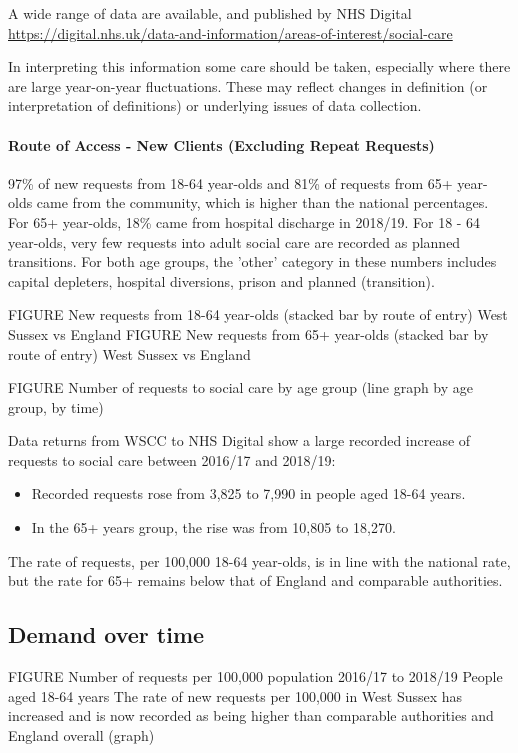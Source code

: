 A wide range of data are available, and published by NHS Digital \url{https://digital.nhs.uk/data-and-information/areas-of-interest/social-care}

In interpreting this information some care should be taken, especially where there are large year-on-year fluctuations. These may reflect changes in definition (or interpretation of definitions) or underlying issues of data collection.

\paragraph{Route of Access - New Clients (Excluding Repeat Requests)} 97\% of new requests from 18-64 year-olds and 81\% of requests from 65+ year- olds came from the community, which is higher than the national percentages. For 65+ year-olds, 18\% came from hospital discharge in 2018/19. For 18 - 64 year-olds, very few requests into adult social care are recorded as planned transitions. For both age groups, the 'other' category in these numbers includes capital depleters, hospital diversions, prison and planned (transition). 

FIGURE New requests from 18-64 year-olds (stacked bar by route of entry) West Sussex vs England
FIGURE New requests from 65+ year-olds (stacked bar by route of entry) West Sussex vs England

FIGURE Number of requests to social care by age group (line graph by age group, by time)

Data returns from WSCC to NHS Digital show a large recorded increase of requests to social care between 2016/17 and 2018/19:

\begin{itemize}[noitemsep]
    \item Recorded requests rose from 3,825 to 7,990 in people aged 18-64 years.
    \item In the 65+ years group, the rise was from 10,805 to 18,270.
\end{itemize}

The rate of requests, per 100,000 18-64 year-olds, is in line with the national rate, but the rate for 65+ remains below that of England and comparable authorities.

\subsection{Demand over time}
FIGURE Number of requests per 100,000 population 2016/17 to 2018/19 People aged 18-64 years The rate of new requests per 100,000 in West Sussex has increased and is now recorded as being higher than comparable authorities and England overall (graph)

